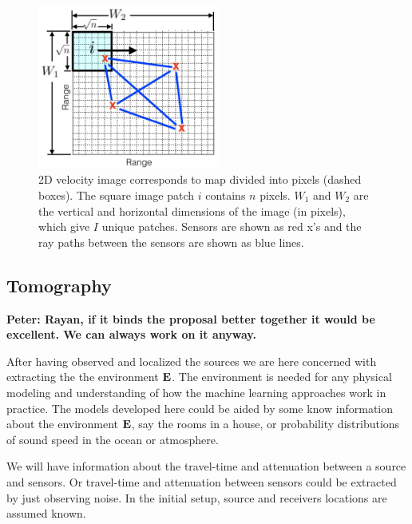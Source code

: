 \begin{figure}[t]
\centering
\includegraphics[width=6cm]{figs/patch.png} 
\caption{2D velocity image corresponds to  map divided into pixels (dashed boxes). The square image patch $i$ contains $n$ pixels. $W_1$ and $W_2$ are the vertical and horizontal dimensions of the image (in pixels), which give $I$ unique patches. Sensors are shown as red x's and the ray paths between the sensors are shown as blue lines.}
\label{fig:patchMap}
\end{figure}
\subsection{Tomography}
{\bf Peter: Rayan, if it binds the proposal better together it would be excellent. We can always work on it anyway.}

After having observed and localized the sources we are here concerned with extracting the the environment $\bf E$. The environment is needed for any physical modeling and understanding of how the machine learning approaches work in practice. The models developed here could be aided by some know information about the environment $\bf E$, say the rooms in a house, or probability distributions of sound speed in the ocean or atmosphere.

We will have information about the travel-time and attenuation between a source and sensors. Or  travel-time and attenuation between sensors could be extracted by just observing noise\cite{shapiro2004, sabra2005, gerstoft2006}. In the initial setup, source and receivers locations are assumed known. 

